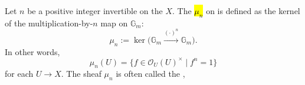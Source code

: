\begin{definition} \label{definition:sheaf_of_nth_roots_of_unity_on_the_small_etale_site_of_a_scheme}
Let $n$ be a positive integer invertible on the  $X$. The  \hl{$\mu_n$} on  is defined as the kernel of the multiplication-by-$n$ map on $\mathbb{G}_m$:
$$ \mu_n := \ker\big( \mathbb{G}_m \xrightarrow{(\cdot)^n} \mathbb{G}_m \big). $$
In other words,
$$ \mu_n(U) = \{ f \in \mathcal{O}_U(U)^\times \mid f^n = 1 \} $$
for each  $U \to X$.
The sheaf $\mu_n$ is often called the , 
\end{definition}